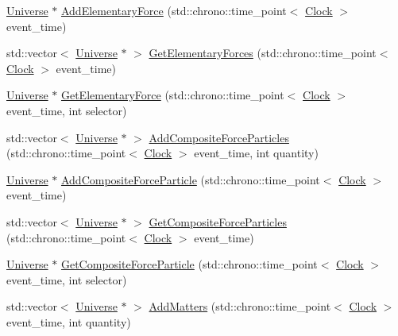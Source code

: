 \begin{DoxyCompactItemize}
\item 
\mbox{\hyperlink{classUniverse}{Universe}} $\ast$ \mbox{\hyperlink{classUniverse_a90c573dec55f2b3ad5680015356f5f25}{Add\+Elementary\+Force}} (std\+::chrono\+::time\+\_\+point$<$ \mbox{\hyperlink{universe_8h_a0ef8d951d1ca5ab3cfaf7ab4c7a6fd80}{Clock}} $>$ event\+\_\+time)
\item 
std\+::vector$<$ \mbox{\hyperlink{classUniverse}{Universe}} $\ast$ $>$ \mbox{\hyperlink{classUniverse_a6a8ed579b2eedd3aceebda9f3d78aa0e}{Get\+Elementary\+Forces}} (std\+::chrono\+::time\+\_\+point$<$ \mbox{\hyperlink{universe_8h_a0ef8d951d1ca5ab3cfaf7ab4c7a6fd80}{Clock}} $>$ event\+\_\+time)
\item 
\mbox{\hyperlink{classUniverse}{Universe}} $\ast$ \mbox{\hyperlink{classUniverse_a9506017d944cb64e67567477c1505a53}{Get\+Elementary\+Force}} (std\+::chrono\+::time\+\_\+point$<$ \mbox{\hyperlink{universe_8h_a0ef8d951d1ca5ab3cfaf7ab4c7a6fd80}{Clock}} $>$ event\+\_\+time, int selector)
\item 
std\+::vector$<$ \mbox{\hyperlink{classUniverse}{Universe}} $\ast$ $>$ \mbox{\hyperlink{classUniverse_a23d74e377203fca7cb74e0ffee7244b6}{Add\+Composite\+Force\+Particles}} (std\+::chrono\+::time\+\_\+point$<$ \mbox{\hyperlink{universe_8h_a0ef8d951d1ca5ab3cfaf7ab4c7a6fd80}{Clock}} $>$ event\+\_\+time, int quantity)
\item 
\mbox{\hyperlink{classUniverse}{Universe}} $\ast$ \mbox{\hyperlink{classUniverse_ab2671c2218c98f0f1f487c5b3bb96e3c}{Add\+Composite\+Force\+Particle}} (std\+::chrono\+::time\+\_\+point$<$ \mbox{\hyperlink{universe_8h_a0ef8d951d1ca5ab3cfaf7ab4c7a6fd80}{Clock}} $>$ event\+\_\+time)
\item 
std\+::vector$<$ \mbox{\hyperlink{classUniverse}{Universe}} $\ast$ $>$ \mbox{\hyperlink{classUniverse_aed37d7224b4e31bdfb0632e39bf19694}{Get\+Composite\+Force\+Particles}} (std\+::chrono\+::time\+\_\+point$<$ \mbox{\hyperlink{universe_8h_a0ef8d951d1ca5ab3cfaf7ab4c7a6fd80}{Clock}} $>$ event\+\_\+time)
\item 
\mbox{\hyperlink{classUniverse}{Universe}} $\ast$ \mbox{\hyperlink{classUniverse_a3e2acc1d75765a6e8e852fca919c5b96}{Get\+Composite\+Force\+Particle}} (std\+::chrono\+::time\+\_\+point$<$ \mbox{\hyperlink{universe_8h_a0ef8d951d1ca5ab3cfaf7ab4c7a6fd80}{Clock}} $>$ event\+\_\+time, int selector)
\item 
std\+::vector$<$ \mbox{\hyperlink{classUniverse}{Universe}} $\ast$ $>$ \mbox{\hyperlink{classUniverse_ae00d10b2a23c9cedf1ff89e9da875563}{Add\+Matters}} (std\+::chrono\+::time\+\_\+point$<$ \mbox{\hyperlink{universe_8h_a0ef8d951d1ca5ab3cfaf7ab4c7a6fd80}{Clock}} $>$ event\+\_\+time, int quantity)

\end{DoxyCompactItemize}

